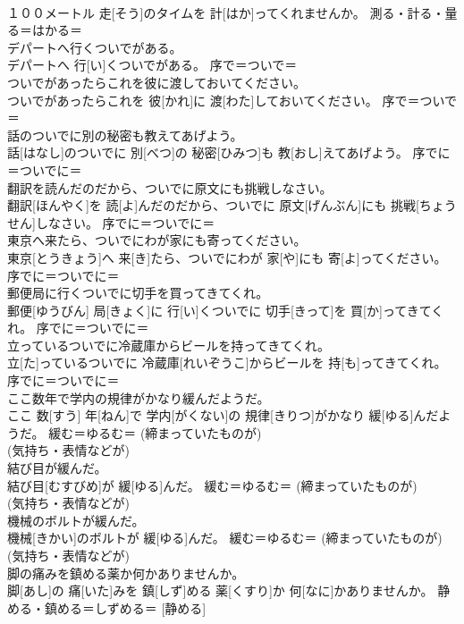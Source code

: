 \documentclass[8pt]{extreport}
\begin{document}
\begin{CJK}{UTF8}{min}
{\\	１００メートル 走[そう]のタイムを 計[はか]ってくれませんか。	測る・計る・量る＝はかる＝ 
\\	デパートへ行くついでがある。	
\\	デパートへ 行[い]くついでがある。	序で＝ついで＝ 
\\	ついでがあったらこれを彼に渡しておいてください。	
\\	ついでがあったらこれを 彼[かれ]に 渡[わた]しておいてください。	序で＝ついで＝ 
\\	話のついでに別の秘密も教えてあげよう。	
\\	話[はなし]のついでに 別[べつ]の 秘密[ひみつ]も 教[おし]えてあげよう。	序でに＝ついでに＝ 
\\	翻訳を読んだのだから、ついでに原文にも挑戦しなさい。	
\\	翻訳[ほんやく]を 読[よ]んだのだから、ついでに 原文[げんぶん]にも 挑戦[ちょうせん]しなさい。	序でに＝ついでに＝ 
\\	東京へ来たら、ついでにわが家にも寄ってください。	
\\	東京[とうきょう]へ 来[き]たら、ついでにわが 家[や]にも 寄[よ]ってください。	序でに＝ついでに＝ 
\\	郵便局に行くついでに切手を買ってきてくれ。	
\\	郵便[ゆうびん] 局[きょく]に 行[い]くついでに 切手[きって]を 買[か]ってきてくれ。	序でに＝ついでに＝ 
\\	立っているついでに冷蔵庫からビールを持ってきてくれ。	
\\	立[た]っているついでに 冷蔵庫[れいぞうこ]からビールを 持[も]ってきてくれ。	序でに＝ついでに＝ 
\\	ここ数年で学内の規律がかなり緩んだようだ。	
\\	ここ 数[すう] 年[ねん]で 学内[がくない]の 規律[きりつ]がかなり 緩[ゆる]んだようだ。	緩む＝ゆるむ＝ (締まっていたものが) 
\\	(気持ち・表情などが) 
\\	結び目が緩んだ。	
\\	結び目[むすびめ]が 緩[ゆる]んだ。	緩む＝ゆるむ＝ (締まっていたものが) 
\\	(気持ち・表情などが) 
\\	機械のボルトが緩んだ。	
\\	機械[きかい]のボルトが 緩[ゆる]んだ。	緩む＝ゆるむ＝ (締まっていたものが) 
\\	(気持ち・表情などが) 
\\	脚の痛みを鎮める薬か何かありませんか。	
\\	脚[あし]の 痛[いた]みを 鎮[しず]める 薬[くすり]か 何[なに]かありませんか。	静める・鎮める＝しずめる＝ [静める] 
}
\end{CJK}
\end{document}
